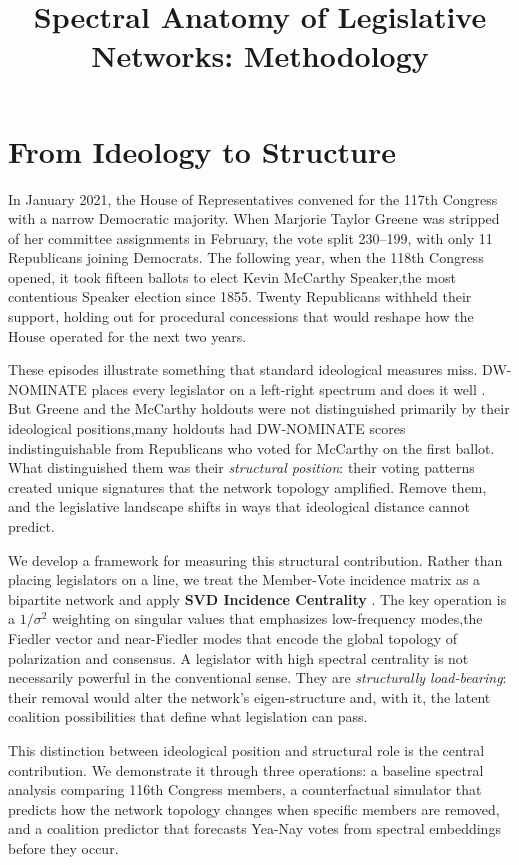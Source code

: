\documentclass[11pt,a4paper]{article}
\title{\textbf{Spectral Anatomy of Legislative Networks: Methodology}}
\author{}
\date{}
\begin{document}
\maketitle

\section{From Ideology to Structure}

In January 2021, the House of Representatives convened for the 117th Congress with a narrow Democratic majority. When Marjorie Taylor Greene was stripped of her committee assignments in February, the vote split 230--199, with only 11 Republicans joining Democrats. The following year, when the 118th Congress opened, it took fifteen ballots to elect Kevin McCarthy Speaker,the most contentious Speaker election since 1855. Twenty Republicans withheld their support, holding out for procedural concessions that would reshape how the House operated for the next two years.

These episodes illustrate something that standard ideological measures miss. DW-NOMINATE places every legislator on a left-right spectrum and does it well \citep{poole1985}. But Greene and the McCarthy holdouts were not distinguished primarily by their ideological positions,many holdouts had DW-NOMINATE scores indistinguishable from Republicans who voted for McCarthy on the first ballot. What distinguished them was their \textit{structural position}: their voting patterns created unique signatures that the network topology amplified. Remove them, and the legislative landscape shifts in ways that ideological distance cannot predict.

We develop a framework for measuring this structural contribution. Rather than placing legislators on a line, we treat the Member-Vote incidence matrix as a bipartite network and apply \textbf{SVD Incidence Centrality} \citep{franco2026}. The key operation is a $1/\sigma^2$ weighting on singular values that emphasizes low-frequency modes,the Fiedler vector and near-Fiedler modes that encode the global topology of polarization and consensus. A legislator with high spectral centrality is not necessarily powerful in the conventional sense. They are \textit{structurally load-bearing}: their removal would alter the network's eigen-structure and, with it, the latent coalition possibilities that define what legislation can pass.

This distinction between ideological position and structural role is the central contribution. We demonstrate it through three operations: a baseline spectral analysis comparing 116th Congress members, a counterfactual simulator that predicts how the network topology changes when specific members are removed, and a coalition predictor that forecasts Yea-Nay votes from spectral embeddings before they occur.
\end{document}
